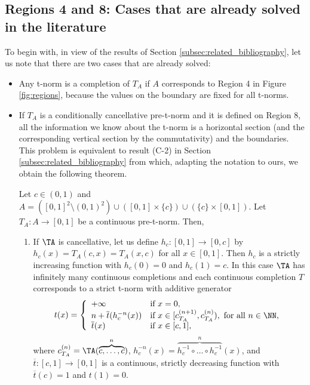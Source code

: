 \subsection{Regions 4 and 8: Cases that are already solved in the literature}

To begin with, in view of the results of Section \ref{subsec:related_bibliography}, let us note that there are two cases that are already solved:
\begin{itemize}	
	\item Any t-norm is a completion of $T_A$ if $A$ corresponds to Region 4 in Figure \ref{fig:regions}, because the values on the boundary are fixed for all t-norms.
	\item If $T_A$ is a conditionally cancellative pre-t-norm and it is defined on Region 8, all the information we know about the t-norm is a horizontal section (and the corresponding vertical section by the commutativity) and the boundaries. This problem is equivalent to result (C-2) in Section \ref{subsec:related_bibliography} from which, adapting the notation to ours, we obtain the following theorem.
	\pagebreak
	\begin{theorem}\label{thm:completion-horizontalsection}
		Let $c\in(0,1)$ and $A=([0,1]^2 \setminus (0,1)^2)\cup([0,1]\times\{c\}) \cup (\{c\} \times [0,1])$. Let $T_A:A\to[0,1]$ be a continuous pre-t-norm. Then,
		\begin{enumerate}[label=(\roman*)]
			\item  If $\TA$ is cancellative, let us define $h_c : [0,1] \to [0,c]$ by $h_c(x)=T_A(c,x)=T_A(x,c)$ for all $x \in [0,1]$. Then $h_c$ is a strictly increasing function with $h_c(0)=0$ and $h_c(1)=c$. In this case $\TA$ has infinitely many continuous completions and each continuous completion $T$ corresponds to a strict t-norm with additive generator
			\begin{equation}\label{eq:can:completion-horizontalsection}
				t(x)=
				\left\{ \begin{array}{ll}
					+\infty	 &   \text{if }   x=0, \\
					n+\overline{t}(h_c^{-n}(x)) & \text{if }  x \in [c_{T_A}^{(n+1)},c_{T_A}^{(n)}), \text{ for all } n \in \NN, \\
					\overline{t}(x) & \text{if } x \in [c,1],
				\end{array} \right.
			\end{equation}
			where $c_{T_A}^{(n)}=\TA(\overbrace{c,\dots,c}^{n})$, $h_c^{-n}(x) =\overbrace{h_c^{-1}\circ \dots \circ h_c^{-1}}^n(x)$, and $\overline{t}:[c,1] \to [0,1]$ is a continuous, strictly decreasing function with $\overline{t}(c)=1$ and $t(1)=0$.

\end{enumerate}
\end{theorem}
\end{itemize}
